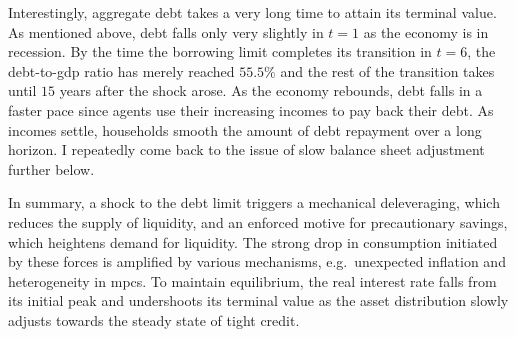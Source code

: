 \documentclass[12pt]{article} %
\numberwithin{equation}{section} %
\numberwithin{figure}{section}
\numberwithin{table}{section}
\begin{document}
Interestingly, aggregate debt takes a very long time to attain its terminal value. As mentioned above, debt falls only very slightly in $t=1$ as the economy is in recession. By the time the borrowing limit completes its transition in $t=6$, the debt-to-\Gls{gdp} ratio has merely reached $55.5\%$ and the rest of the transition takes until $15$ years after the shock arose. As the economy rebounds, debt falls in a faster pace since agents use their increasing incomes to pay back their debt. As incomes settle, households smooth the amount of debt repayment over a long horizon. I repeatedly come back to the issue of slow balance sheet adjustment further below.

In summary, a shock to the debt limit triggers a mechanical deleveraging, which reduces the supply of liquidity, and an enforced motive for precautionary savings, which heightens demand for liquidity. The strong drop in consumption initiated by these forces is amplified by various mechanisms, e.g.~unexpected inflation and heterogeneity in \Gls{mpc}s. To maintain equilibrium, the real interest rate falls from its initial peak and undershoots its terminal value as the asset distribution slowly adjusts towards the steady state of tight credit.



\end{document}
